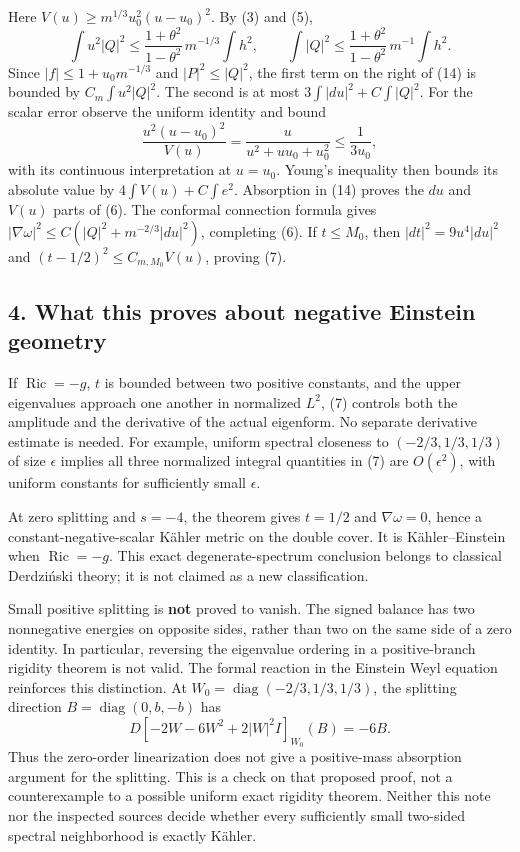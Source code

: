 \documentclass[
  11pt,
]{article}
\begin{document}
Here \(V(u)\ge m^{1/3}u_0^2(u-u_0)^2\). By (3) and (5), \[
 \int u^2|Q|^2\le
       \frac{1+\theta^2}{1-\theta^2}\,m^{-1/3}\int h^2,
 \qquad
 \int |Q|^2\le
       \frac{1+\theta^2}{1-\theta^2}\,m^{-1}\int h^2.
\tag{15}
\] Since \(|f|\le 1+u_0m^{-1/3}\) and \(|P|^2\le|Q|^2\), the first term
on the right of (14) is bounded by \(C_m\int u^2|Q|^2\). The second is
at most \(3\int|du|^2+C\int|Q|^2\). For the scalar error observe the
uniform identity and bound \[
 \frac{u^2(u-u_0)^2}{V(u)}
 =\frac{u}{u^2+uu_0+u_0^2}\le\frac1{3u_0},
\] with its continuous interpretation at \(u=u_0\). Young's inequality
then bounds its absolute value by \(4\int V(u)+C\int e^2\). Absorption
in (14) proves the \(du\) and \(V(u)\) parts of (6). The conformal
connection formula gives
\(|\nabla\omega|^2\le C(|Q|^2+m^{-2/3}|du|^2)\), completing (6). If
\(t\le M_0\), then \(|dt|^2=9u^4|du|^2\) and
\((t-1/2)^2\le C_{m,M_0}V(u)\), proving (7).

\hypertarget{what-this-proves-about-negative-einstein-geometry}{%
\subsection{4. What this proves about negative Einstein
geometry}\label{what-this-proves-about-negative-einstein-geometry}}

If \(\operatorname{Ric}=-g\), \(t\) is bounded between two positive
constants, and the upper eigenvalues approach one another in normalized
\(L^2\), (7) controls both the amplitude and the derivative of the
actual eigenform. No separate derivative estimate is needed. For
example, uniform spectral closeness to \((-2/3,1/3,1/3)\) of size
\(\epsilon\) implies all three normalized integral quantities in (7) are
\(O(\epsilon^2)\), with uniform constants for sufficiently small
\(\epsilon\).

At zero splitting and \(s=-4\), the theorem gives \(t=1/2\) and
\(\nabla\omega=0\), hence a constant-negative-scalar Kähler metric on
the double cover. It is Kähler--Einstein when \(\operatorname{Ric}=-g\).
This exact degenerate-spectrum conclusion belongs to classical
Derdziński theory; it is not claimed as a new classification.

Small positive splitting is \textbf{not} proved to vanish. The signed
balance has two nonnegative energies on opposite sides, rather than two
on the same side of a zero identity. In particular, reversing the
eigenvalue ordering in a positive-branch rigidity theorem is not valid.
The formal reaction in the Einstein Weyl equation reinforces this
distinction. At \(W_0=\operatorname{diag}(-2/3,1/3,1/3)\), the splitting
direction \(B=\operatorname{diag}(0,b,-b)\) has \[
 D\left[-2W-6W^2+2|W|^2I\right]_{W_0}(B)=-6B.
\] Thus the zero-order linearization does not give a positive-mass
absorption argument for the splitting. This is a check on that proposed
proof, not a counterexample to a possible uniform exact rigidity
theorem. Neither this note nor the inspected sources decide whether
every sufficiently small two-sided spectral neighborhood is exactly
Kähler.
\end{document}
